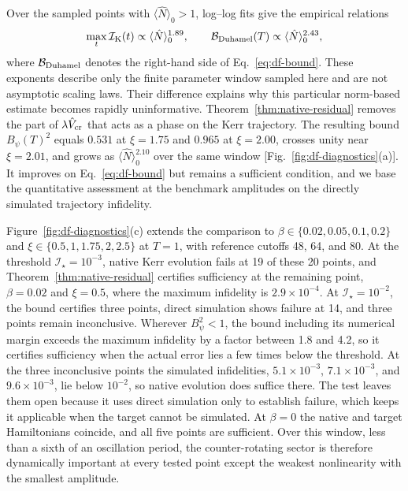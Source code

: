 \documentclass[pra,twocolumn,superscriptaddress,nofootinbib,floatfix]{revtex4-2}
\theoremstyle{remark}
\newcommand{\revcolor}{\color{blue}}
\DeclareRobustCommand{\rev}[1]{{\revcolor #1}}
\begin{document}
\rev{Over the sampled points with \(\langle\hat N\rangle_0>1\), log--log fits give the empirical relations}
\begingroup\revcolor
\begin{align}
\max_t\mathcal I_{\rm K}(t)\propto\langle\hat N\rangle_0^{1.89},\qquad\mathcal B_{\rm Duhamel}(T)\propto\langle\hat N\rangle_0^{2.43},
\end{align}
\endgroup
where \(\mathcal B_{\rm Duhamel}\) denotes the right-hand side of Eq.~\eqref{eq:df-bound}. These exponents describe only the finite parameter window sampled here and are not asymptotic scaling laws. Their difference explains why this particular norm-based estimate becomes rapidly uninformative. \rev{Theorem~\ref{thm:native-residual} removes the part of \(\lambda\hat V_{\rm cr}\) that acts as a phase on the Kerr trajectory.} \rev{The resulting bound \(B_\psi(T)^2\) equals \(0.531\) at \(\xi=1.75\) and \(0.965\) at \(\xi=2.00\), crosses unity near \(\xi=2.01\), and grows as \(\langle\hat N\rangle_0^{2.10}\) over the same window [Fig.~\ref{fig:df-diagnostics}(a)].} \rev{It improves on Eq.~\eqref{eq:df-bound} but remains a sufficient condition, and we base the quantitative assessment at the benchmark amplitudes on the directly simulated trajectory infidelity.}

\rev{Figure~\ref{fig:df-diagnostics}(c) extends the comparison to \(\beta\in\{0.02,0.05,0.1,0.2\}\) and \(\xi\in\{0.5,1,1.75,2,2.5\}\) at \(T=1\), with reference cutoffs 48, 64, and 80.} \rev{At the threshold \(\mathcal I_\star=10^{-3}\), native Kerr evolution fails at 19 of these 20 points, and Theorem~\ref{thm:native-residual} certifies sufficiency at the remaining point, \(\beta=0.02\) and \(\xi=0.5\), where the maximum infidelity is \(2.9\times10^{-4}\).} \rev{At \(\mathcal I_\star=10^{-2}\), the bound certifies three points, direct simulation shows failure at 14, and three points remain inconclusive.} \rev{Wherever \(B_\psi^2<1\), the bound including its numerical margin exceeds the maximum infidelity by a factor between 1.8 and 4.2, so it certifies sufficiency when the actual error lies a few times below the threshold.} \rev{At the three inconclusive points the simulated infidelities, \(5.1\times10^{-3}\), \(7.1\times10^{-3}\), and \(9.6\times10^{-3}\), lie below \(10^{-2}\), so native evolution does suffice there.} \rev{The test leaves them open because it uses direct simulation only to establish failure, which keeps it applicable when the target cannot be simulated.} \rev{At \(\beta=0\) the native and target Hamiltonians coincide, and all five points are sufficient.} \rev{Over this window, less than a sixth of an oscillation period, the counter-rotating sector is therefore dynamically important at every tested point except the weakest nonlinearity with the smallest amplitude.}
\end{document}
